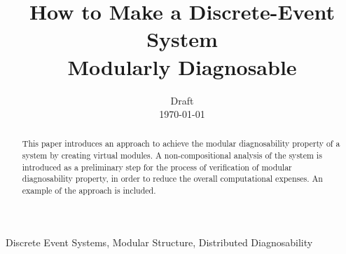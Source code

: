 \documentclass[a4paper, 10pt, conference]{ieeeconf}
\begin{document}
\title{How to Make a Discrete-Event System \\ Modularly Diagnosable}
\author{Draft \\ \today}
\maketitle


\begin{abstract}
This paper introduces an approach to achieve the modular diagnosability property
of a system by creating virtual modules. A non-compositional analysis of the
system is introduced as a preliminary step for the process of verification of
modular diagnosability property, in order to reduce the overall computational
expenses. An example of the approach is included.
\end{abstract}

\begin{keywords}
Discrete Event Systems, Modular Structure, Distributed Diagnosability
\end{keywords}

\newtheorem{assumption}{Assumption}
\newtheorem{definition}{Definition}
\newtheorem{conjecture}{Conjecture}
\newtheorem{lemma}{Lemma}
\newtheorem{corollary}{Corollary}
\newtheorem{example}{Example}
\newtheorem{theorem}{Theorem}

\end{document}
